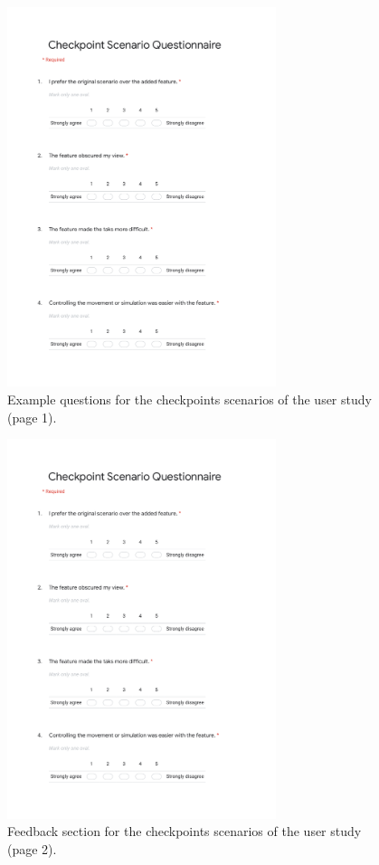 \begin{figure}[h]
    \centering
    \includegraphics[width=0.7\textwidth]{content/appendix/docs/CheckpointScenarioQuestionnaire}
    \caption{Example questions for the checkpoints scenarios of the user study (page 1)\footnotemark.}
    \label{fig:study-checkpoint-questionnaire-1}
\end{figure}
\newpage

\begin{figure}[h]
    \centering
    \includegraphics[width=0.7\textwidth, page=2]{content/appendix/docs/CheckpointScenarioQuestionnaire}
    \caption{Feedback section for the checkpoints scenarios of the user study (page 2).}
    \label{fig:study-checkpoint-questionnaire-2}
\end{figure}
\newpage

